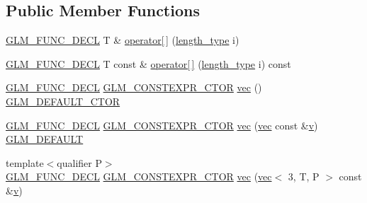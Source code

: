 \subsection*{Public Member Functions}
\begin{DoxyCompactItemize}
\item 
\hyperlink{setup_8hpp_ab2d052de21a70539923e9bcbf6e83a51}{G\+L\+M\+\_\+\+F\+U\+N\+C\+\_\+\+D\+E\+CL} T \& \hyperlink{structglm_1_1vec_3_013_00_01_t_00_01_q_01_4_a7f555e7e0581a8e53ac675fde684055b}{operator\mbox{[}$\,$\mbox{]}} (\hyperlink{structglm_1_1vec_3_013_00_01_t_00_01_q_01_4_ab586a87f82719bfdd180336a98843257}{length\+\_\+type} i)
\item 
\hyperlink{setup_8hpp_ab2d052de21a70539923e9bcbf6e83a51}{G\+L\+M\+\_\+\+F\+U\+N\+C\+\_\+\+D\+E\+CL} T const  \& \hyperlink{structglm_1_1vec_3_013_00_01_t_00_01_q_01_4_a361188d270506795b9a46c2fc2857e69}{operator\mbox{[}$\,$\mbox{]}} (\hyperlink{structglm_1_1vec_3_013_00_01_t_00_01_q_01_4_ab586a87f82719bfdd180336a98843257}{length\+\_\+type} i) const
\item 
\hyperlink{setup_8hpp_ab2d052de21a70539923e9bcbf6e83a51}{G\+L\+M\+\_\+\+F\+U\+N\+C\+\_\+\+D\+E\+CL} \hyperlink{setup_8hpp_ad34178a09666081abdb573c14d1f4a5a}{G\+L\+M\+\_\+\+C\+O\+N\+S\+T\+E\+X\+P\+R\+\_\+\+C\+T\+OR} \hyperlink{structglm_1_1vec_3_013_00_01_t_00_01_q_01_4_af6f5237c5ef6d93d6125989b4657b3cc}{vec} () \hyperlink{setup_8hpp_afb97a4e995bc004c0cbbfa22125b80ba}{G\+L\+M\+\_\+\+D\+E\+F\+A\+U\+L\+T\+\_\+\+C\+T\+OR}
\item 
\hyperlink{setup_8hpp_ab2d052de21a70539923e9bcbf6e83a51}{G\+L\+M\+\_\+\+F\+U\+N\+C\+\_\+\+D\+E\+CL} \hyperlink{setup_8hpp_ad34178a09666081abdb573c14d1f4a5a}{G\+L\+M\+\_\+\+C\+O\+N\+S\+T\+E\+X\+P\+R\+\_\+\+C\+T\+OR} \hyperlink{structglm_1_1vec_3_013_00_01_t_00_01_q_01_4_ae7088be55070909fe11da6bead3679f9}{vec} (\hyperlink{structglm_1_1vec}{vec} const \&\hyperlink{_s_d_l__opengl_8h_a10a82eabcb59d2fcd74acee063775f90}{v}) \hyperlink{setup_8hpp_aefce7051c376a64ba89fa93a9f63bc2c}{G\+L\+M\+\_\+\+D\+E\+F\+A\+U\+LT}
\item 
{\footnotesize template$<$qualifier P$>$ }\\\hyperlink{setup_8hpp_ab2d052de21a70539923e9bcbf6e83a51}{G\+L\+M\+\_\+\+F\+U\+N\+C\+\_\+\+D\+E\+CL} \hyperlink{setup_8hpp_ad34178a09666081abdb573c14d1f4a5a}{G\+L\+M\+\_\+\+C\+O\+N\+S\+T\+E\+X\+P\+R\+\_\+\+C\+T\+OR} \hyperlink{structglm_1_1vec_3_013_00_01_t_00_01_q_01_4_a1b43d4595236da757e4054e1a4717153}{vec} (\hyperlink{structglm_1_1vec}{vec}$<$ 3, T, P $>$ const \&\hyperlink{_s_d_l__opengl_8h_a10a82eabcb59d2fcd74acee063775f90}{v})

\end{DoxyCompactItemize}
